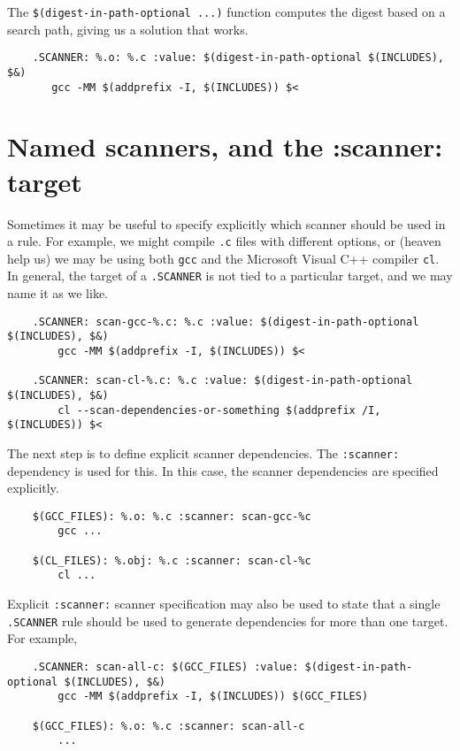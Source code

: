 The \verb+$(digest-in-path-optional ...)+ function computes the digest based on a search path,
giving us a solution that works.

\begin{verbatim}
    .SCANNER: %.o: %.c :value: $(digest-in-path-optional $(INCLUDES), $&)
       gcc -MM $(addprefix -I, $(INCLUDES)) $<
\end{verbatim}

\section{Named scanners, and the :scanner: target}

Sometimes it may be useful to specify explicitly which scanner should be used in a rule.  For
example, we might compile \verb+.c+ files with different options, or (heaven help us) we may be
using both \verb+gcc+ and the Microsoft Visual C++ compiler \verb+cl+. In general, the target of a
\verb+.SCANNER+ is not tied to a particular target, and we may name it as we like.

\begin{verbatim}
    .SCANNER: scan-gcc-%.c: %.c :value: $(digest-in-path-optional $(INCLUDES), $&)
        gcc -MM $(addprefix -I, $(INCLUDES)) $<

    .SCANNER: scan-cl-%.c: %.c :value: $(digest-in-path-optional $(INCLUDES), $&)
        cl --scan-dependencies-or-something $(addprefix /I, $(INCLUDES)) $<
\end{verbatim}

The next step is to define explicit scanner dependencies.  The \verb+:scanner:+ dependency is used
for this.  In this case, the scanner dependencies are specified explicitly.

\begin{verbatim}
    $(GCC_FILES): %.o: %.c :scanner: scan-gcc-%c
        gcc ...

    $(CL_FILES): %.obj: %.c :scanner: scan-cl-%c
        cl ...
\end{verbatim}

Explicit \verb+:scanner:+ scanner specification may also be used to state that a single
\verb+.SCANNER+ rule should be used to generate dependencies for more than one target. For example,

\begin{verbatim}
    .SCANNER: scan-all-c: $(GCC_FILES) :value: $(digest-in-path-optional $(INCLUDES), $&)
        gcc -MM $(addprefix -I, $(INCLUDES)) $(GCC_FILES)

    $(GCC_FILES): %.o: %.c :scanner: scan-all-c
        ...
\end{verbatim}

